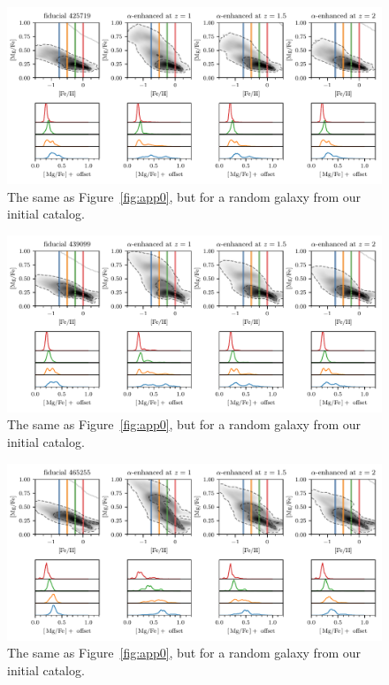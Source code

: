 \begin{appendices}
\begin{figure}
  \centering
  \includegraphics[width=\textwidth]{ch4/app_425719.pdf}
  \caption{The same as Figure~\ref{fig:app0}, but for a random galaxy from our initial catalog.}
  \label{fig:app10}
\end{figure}

\begin{figure}
  \centering
  \includegraphics[width=\textwidth]{ch4/app_439099.pdf}
  \caption{The same as Figure~\ref{fig:app0}, but for a random galaxy from our initial catalog.}
  \label{fig:app11}
\end{figure}

\begin{figure}
  \centering
  \includegraphics[width=\textwidth]{ch4/app_465255.pdf}
  \caption{The same as Figure~\ref{fig:app0}, but for a random galaxy from our initial catalog.}
  \label{fig:app12}
\end{figure}


\end{appendices}
